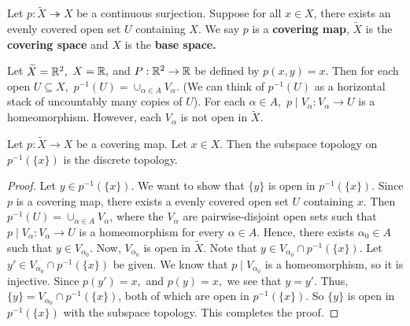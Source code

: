 \begin{definition}
	Let $p: \widetilde{X} \twoheadrightarrow X$ be a continuous surjection. Suppose for all $x \in X$, there exists an evenly covered open set $U$ containing $X$. We say $p$ is a \textbf{covering map}, $\widetilde{X}$ is the \textbf{covering space} and $X$ is the \textbf{base space.} 
\end{definition}
\begin{example}
	 Let $\widetilde{X}=\mathbb R^2,$ $X=\mathbb R,$ and $P:\mathbb R^2\rightarrow \mathbb R$ be defined by $p(x,y)=x$. Then for each open $U \subseteq X,$ $p^{-1}(U)=\cup_{\alpha \in A}V_{\alpha}.$ (We can think of $p^{-1}(U)$ as a horizontal stack of uncountably many copies of $U$). For each $\alpha \in A,$ $p \mid V_{\alpha}: V_{\alpha} \rightarrow U$ is a homeomorphism. However, each $V_{\alpha}$ is not open in $\widetilde{X}$. 
\end{example}
\begin{lemma}
	 Let $p:\widetilde{X} \rightarrow X$ be a covering map. Let $x \in X$. Then the subspace topology on $p^{-1}(\{x\})$ is the discrete topology. 
\end{lemma}
\begin{proof}
	Let $y \in p^{-1}(\{x\}).$ We want to show that $\{y\}$ is open in $p^{-1}(\{x\})$. Since $p$ is a covering map, there exists a evenly covered open set $U$ containing $x$. Then $p^{-1}(U)=\cup_{\alpha \in A}V_{\alpha}$, where the $V_{\alpha}$ are pairwise-disjoint open sets such that $p \mid V_{\alpha}:V_{\alpha}\rightarrow U$ is a homeomorphism for every $\alpha \in A$. Hence, there exists $\alpha_0 \in A$ such that $y \in V_{\alpha_0}$. Now, $V_{\alpha_0}$ is open in $\widetilde{X}$. Note that $y \in V_{\alpha_0}\cap p^{-1}(\{x\})$. Let $y' \in V_{\alpha_0} \cap p^{-1}(\{x\})$ be given. We know that $p \mid V_{\alpha_0}$ is a homeomorphism, so it is injective. Since $p(y')=x,$ and $p(y)=x,$ we see that $y=y'$. Thus, $\{y\}=V_{\alpha_0} \cap p^{-1}(\{x\})$, both of which are open in $p^{-1}(\{x\}).$ So $\{y\}$ is open in $p^{-1}(\{x\})$ with the subspace topology. This completes the proof. 
\end{proof}

